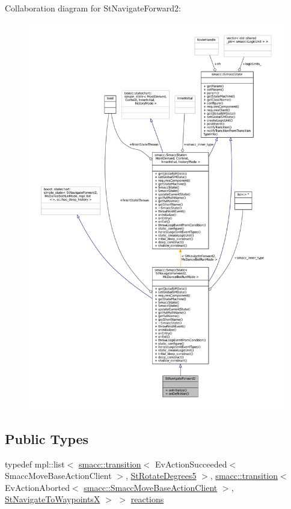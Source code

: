 Collaboration diagram for St\+Navigate\+Forward2\+:
\nopagebreak
\begin{figure}[H]
\begin{center}
\leavevmode
\includegraphics[width=350pt]{structStNavigateForward2__coll__graph}
\end{center}
\end{figure}
\subsection*{Public Types}
\begin{DoxyCompactItemize}
\item 
typedef mpl\+::list$<$ \hyperlink{classsmacc_1_1transition}{smacc\+::transition}$<$ Ev\+Action\+Succeeded$<$ Smacc\+Move\+Base\+Action\+Client $>$, \hyperlink{structStRotateDegrees5}{St\+Rotate\+Degrees5} $>$, \hyperlink{classsmacc_1_1transition}{smacc\+::transition}$<$ Ev\+Action\+Aborted$<$ \hyperlink{classsmacc_1_1SmaccMoveBaseActionClient}{smacc\+::\+Smacc\+Move\+Base\+Action\+Client} $>$, \hyperlink{structStNavigateToWaypointsX}{St\+Navigate\+To\+WaypointsX} $>$ $>$ \hyperlink{structStNavigateForward2_a409378565b2401a00842f1986b51b160}{reactions}
\end{DoxyCompactItemize}
